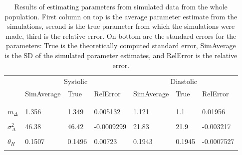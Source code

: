 \documentclass[
]{article}
\begin{document}
\begin{table}[!h]
\centering
\caption{\label{tab:testparameters}Results of estimating parameters from simulated data from the whole population. 
    First column on top is the average parameter estimate from the simulations, second is the true parameter from which the simulations were made, third is the relative error.
    On bottom are the standard errors for the parameters: True is the theoretically computed standard error, SimAverage is the SD of the simulated parameter estimates, and RelError is the relative error.}
\centering
\begin{tabular}[t]{lllllll}
\toprule
\multicolumn{1}{c}{ } & \multicolumn{3}{c}{Systolic} & \multicolumn{3}{c}{Diastolic} \\
\cmidrule(l{3pt}r{3pt}){2-4} \cmidrule(l{3pt}r{3pt}){5-7}
  & SimAverage & True & RelError & SimAverage & True & RelError\\
\midrule
\addlinespace[0.3em]
\multicolumn{7}{l}{\textbf{Parameter estimates}}\\
\cellcolor{gray!10}{\hspace{1em}$m_M$} & \cellcolor{gray!10}{123.4} & \cellcolor{gray!10}{123.3} & \cellcolor{gray!10}{0.0003251} & \cellcolor{gray!10}{72.31} & \cellcolor{gray!10}{72.31} & \cellcolor{gray!10}{2.288e-05}\\
\hspace{1em}$m_\Delta$ & 1.356 & 1.349 & 0.005132 & 1.121 & 1.1 & 0.01956\\
\cellcolor{gray!10}{\hspace{1em}$\sigma^2_M$} & \cellcolor{gray!10}{378.6} & \cellcolor{gray!10}{376.8} & \cellcolor{gray!10}{0.004887} & \cellcolor{gray!10}{103.5} & \cellcolor{gray!10}{104} & \cellcolor{gray!10}{-0.004857}\\
\hspace{1em}$\sigma^2_\Delta$ & 46.38 & 46.42 & -0.0009299 & 21.83 & 21.9 & -0.003217\\
\cellcolor{gray!10}{\hspace{1em}$\alpha_H$} & \cellcolor{gray!10}{2.134} & \cellcolor{gray!10}{2.158} & \cellcolor{gray!10}{-0.01091} & \cellcolor{gray!10}{2.341} & \cellcolor{gray!10}{2.322} & \cellcolor{gray!10}{0.008034}\\
\hspace{1em}$\theta_H$ & 0.1507 & 0.1496 & 0.00723 & 0.1943 & 0.1945 & -0.0007527\\
\cellcolor{gray!10}{\hspace{1em}$\alpha_C$} & \cellcolor{gray!10}{2.638} & \cellcolor{gray!10}{2.569} & \cellcolor{gray!10}{0.02673} & \cellcolor{gray!10}{2.766} & \cellcolor{gray!10}{2.756} & \cellcolor{gray!10}{0.003552}\\

\end{tabular}
\end{table}
\end{document}
